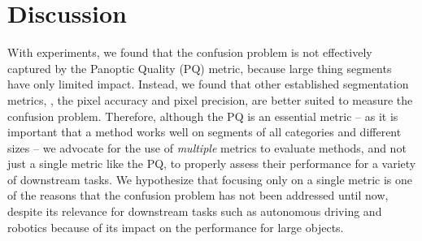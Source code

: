 \documentclass[10pt,twocolumn,letterpaper]{article}
\begin{document}
 \section{Discussion}
\label{sec:discussion}
With experiments, we found that the confusion problem is not effectively captured by the Panoptic Quality (PQ) metric, because large thing segments have only limited impact.
Instead, we found that other established segmentation metrics, \ie, the pixel accuracy and pixel precision, are better suited to measure the confusion problem. Therefore, although the PQ is an essential metric -- as it is important that a method works well on segments of all categories and different sizes -- we advocate for the use of \textit{multiple} metrics to evaluate methods, and not just a single metric like the PQ, to properly assess their performance for a variety of downstream tasks.
We hypothesize that focusing only on a single metric is one of the reasons that the confusion problem has not been addressed until now, despite its relevance for downstream tasks such as autonomous driving and robotics because of its impact on the performance for large objects.

\begin{table}[t]
\centering
{}
\caption{\textbf{Instance segmentation.} IBS results for instance segmentation with Mask2Former~\cite{cheng2021mask2former} evaluated on the Mapillary Vistas \textit{validation} set~\cite{neuhold2017mapillary}.}
\label{tab:results_inst_seg}
\vspace{0pt}
\end{table} 
\end{document}
